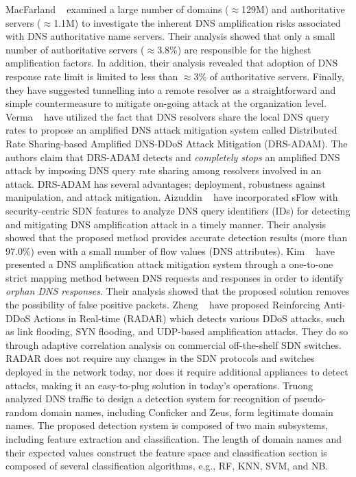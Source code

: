 MacFarland \etal~ examined a large number of domains ($\approx$129M) and authoritative servers ($\approx$1.1M) to investigate the inherent DNS amplification risks associated with DNS authoritative name servers. Their analysis showed that only a small number of authoritative servers ($\approx$3.8\%) are responsible for the highest amplification factors. In addition, their analysis revealed that adoption of DNS response rate limit is limited to less than $\approx$3\% of authoritative servers. Finally, they have suggested tunnelling into a remote resolver as a straightforward and simple countermeasure to mitigate on-going attack at the organization level. 
Verma \etal~ have utilized the fact that DNS resolvers share the local DNS query rates to propose an amplified DNS attack mitigation system called Distributed Rate Sharing-based Amplified DNS-DDoS Attack Mitigation (DRS-ADAM). The authors claim that DRS-ADAM detects and \textit{completely stops} an amplified DNS attack by imposing DNS query rate sharing among resolvers involved in an attack. DRS-ADAM has several advantages; deployment, robustness against manipulation, and attack mitigation.  
Aizuddin \etal~ have incorporated sFlow with security-centric SDN features to analyze DNS query identifiers (IDs) for detecting and mitigating DNS amplification attack in a timely manner. Their analysis showed that the proposed method provides accurate detection results (more than 97.0\%) even with a small number of flow values (DNS attributes). 
Kim \etal~ have presented a DNS amplification attack mitigation system through a one-to-one strict mapping method between DNS requests and responses in order to identify {\em orphan DNS responses}. Their analysis showed that the proposed solution removes the possibility of false positive packets. 
Zheng \etal~ have proposed Reinforcing Anti-DDoS Actions in Real-time (RADAR) which detects various DDoS attacks, such as link flooding, SYN flooding, and UDP-based amplification attacks. They do so through adaptive correlation analysis on commercial off-the-shelf SDN switches. RADAR does not require any changes in the SDN protocols and switches deployed in the network today, nor does it require additional appliances to detect attacks, making it an easy-to-plug solution in today's operations. 
Truong \etal~ analyzed DNS traffic to design a detection system for recognition of pseudo-random domain names, including Conficker and Zeus, form legitimate domain names. The proposed detection system is composed of two main subsystems, including feature extraction and classification. The length of domain names and their expected values construct the feature space and classification section is composed of several classification algorithms, e.g., RF, KNN, SVM, and NB.
